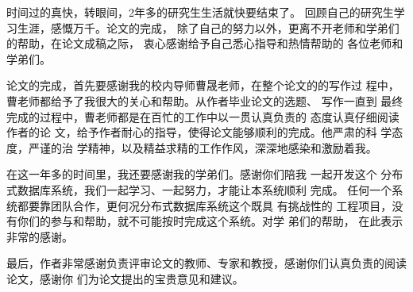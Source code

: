 时间过的真快，转眼间，2年多的研究生生活就快要结束了。
回顾自己的研究生学习生涯，感慨万千。论文的完成，
除了自己的努力以外，更离不开老师和学弟们的帮助，在论文成稿之际，
衷心感谢给予自己悉心指导和热情帮助的
各位老师和学弟们。 

论文的完成，首先要感谢我的校内导师曹晟老师，在整个论文的的写作过
程中，曹老师都给予了我很大的关心和帮助。从作者毕业论文的选题、
写作一直到
最终完成的过程中，曹老师都是在百忙的工作中以一贯认真负责的
态度认真仔细阅读
作者的论
文，给予作者耐心的指导，使得论文能够顺利的完成。他严肃的科
学态度，严谨的治
学精神，以及精益求精的工作作风，深深地感染和激励着我。

在这一年多的时间里，我还要感谢我的学弟们。感谢你们陪我
一起开发这个
分布式数据库系统，我们一起学习、一起努力，才能让本系统顺利
完成。
任何一个系统都要靠团队合作，更何况分布式数据库系统这个既具
有挑战性的
工程项目，没有你们的参与和帮助，就不可能按时完成这个系统。对学
弟们的帮助，
在此表示非常的感谢。

最后，作者非常感谢负责评审论文的教师、专家和教授，感谢你们认真负责的阅读论文，感谢你
们为论文提出的宝贵意见和建议。